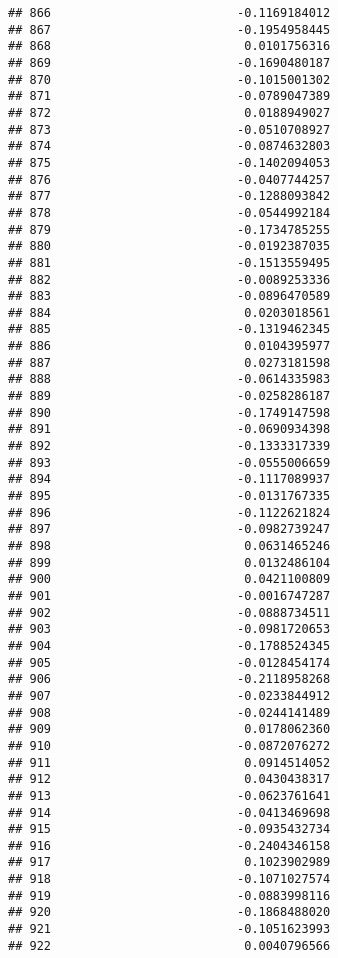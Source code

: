 \documentclass[
]{article}
\begin{document}
\begin{verbatim}
## 866                          -0.1169184012
## 867                          -0.1954958445
## 868                           0.0101756316
## 869                          -0.1690480187
## 870                          -0.1015001302
## 871                          -0.0789047389
## 872                           0.0188949027
## 873                          -0.0510708927
## 874                          -0.0874632803
## 875                          -0.1402094053
## 876                          -0.0407744257
## 877                          -0.1288093842
## 878                          -0.0544992184
## 879                          -0.1734785255
## 880                          -0.0192387035
## 881                          -0.1513559495
## 882                          -0.0089253336
## 883                          -0.0896470589
## 884                           0.0203018561
## 885                          -0.1319462345
## 886                           0.0104395977
## 887                           0.0273181598
## 888                          -0.0614335983
## 889                          -0.0258286187
## 890                          -0.1749147598
## 891                          -0.0690934398
## 892                          -0.1333317339
## 893                          -0.0555006659
## 894                          -0.1117089937
## 895                          -0.0131767335
## 896                          -0.1122621824
## 897                          -0.0982739247
## 898                           0.0631465246
## 899                           0.0132486104
## 900                           0.0421100809
## 901                          -0.0016747287
## 902                          -0.0888734511
## 903                          -0.0981720653
## 904                          -0.1788524345
## 905                          -0.0128454174
## 906                          -0.2118958268
## 907                          -0.0233844912
## 908                          -0.0244141489
## 909                           0.0178062360
## 910                          -0.0872076272
## 911                           0.0914514052
## 912                           0.0430438317
## 913                          -0.0623761641
## 914                          -0.0413469698
## 915                          -0.0935432734
## 916                          -0.2404346158
## 917                           0.1023902989
## 918                          -0.1071027574
## 919                          -0.0883998116
## 920                          -0.1868488020
## 921                          -0.1051623993
## 922                           0.0040796566

\end{verbatim}
\end{document}
